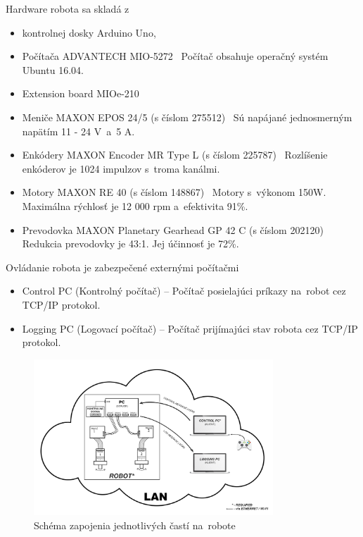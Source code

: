 Hardware robota sa skladá z
\begin{itemize}
	\item kontrolnej dosky Arduino Uno,

	\item Počítača ADVANTECH MIO-5272~\cite{robotPc} \newline
		Počítač obsahuje operačný systém Ubuntu 16.04.

	\item Extension board MIOe-210~\cite{extensionModule}

	\item Meniče MAXON EPOS 24/5 (s číslom 275512)~\cite{menic} \newline
	 	Sú napájané jednosmerným napätím 11 - 24 V~a~5 A.

	\item Enkódery MAXON Encoder MR Type L (s číslom 225787)~\cite{encoder} \newline
		Rozlíšenie enkóderov je 1024 impulzov s~troma kanálmi.

	\item Motory MAXON RE 40 (s číslom 148867)~\cite{motor} \newline
		Motory s~výkonom 150W. Maximálna rýchlosť je 12 000 rpm a~efektivita 91\%.

	\item Prevodovka MAXON Planetary Gearhead GP 42 C (s číslom 202120)~\cite{prevodovka} \newline
		Redukcia prevodovky je 43:1. Jej účinnosť je 72\%.
\end{itemize}

\noindent Ovládanie robota je zabezpečené externými počítačmi
\begin{itemize}
	\item Control PC (Kontrolný počítač) -- Počítač posielajúci príkazy na~robot cez TCP/IP protokol.
	\item Logging PC (Logovací počítač) -- Počítač prijímajúci stav robota cez TCP/IP protokol.
\end{itemize}

\begin{figure}[!htbp]
	\begin{center}
		\includegraphics[width=9cm]{img/schemaRobota.png}
	\end{center}
	\caption{Schéma zapojenia jednotlivých častí na~robote}
	\label{fig:schemaRobota}
\end{figure}

